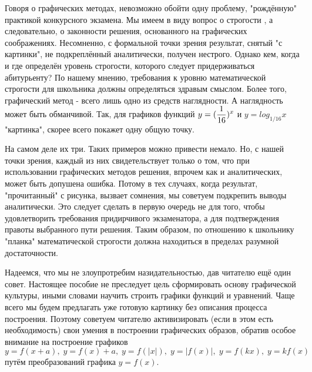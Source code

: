 \documentclass{article}
\begin{document}
 
Говоря о графических методах, невозможно обойти одну проблему, "рождённую" практикой конкурсного экзамена. Мы имеем в виду вопрос о строгости , а следовательно, о законности решения, основанного на графических соображениях. Несомненно, с формальной точки зрения результат, снятый "с картинки", не подкреплённый аналитически, получен нестрого. Однако кем, когда и где определён уровень строгости, которого следует придерживаться абитурьенту? По нашему мнению, требования к уровню математической строгости для школьника должны определяться здравым смыслом. Более того, графический метод - всего лишь одно из средств наглядности. А наглядность может быть обманчивой. Так, для графиков функций $\displaystyle y = ({{1}\over{16}})^x$ и $\displaystyle y = log_{1/16}x$ "картинка", скорее всего покажет одну общую точку.
 
На самом деле их три. Таких примеров можно привести немало. Но, с нашей точки зрения, каждый из них свидетельствует только о том, что при использовании графических методов решения, впрочем как и аналитических, может быть допушена ошибка. Потому в тех случаях, когда результат, "прочитанный" с рисунка, вызвает сомнения, мы советуем подкрепить выводы  аналитически. Это следует сделать в первую очередь не для того, чтобы удовлетворить требования придирчивого  экзаменатора, а для подтверждения правоты выбранного пути решения. Таким образом, по отношению к школьнику "планка" математической строгости должна находиться в пределах разумной достаточности.
 
Надеемся, что мы не злоупротребим назидательностью, дав читателю ещё один совет. Настоящее пособие не преследует цель сформировать основу графической культуры, иными словами научить строить графики функций и уравнений. Чаще всего мы будем предлагать уже готовую картинку без описания процесса построения. Поэтому советуем читателю активизировать (если в этом есть необходимость) свои умения в построении графических образов, обратив особое внимание на построение графиков $ y = f(x+a),\; y = f(x) + a,\; y = f(|x|),\; y = |f(x)|,\; y = f(kx),\; y = kf(x)$ путём преобразований графика $ y = f(x)$. 
 
\end{document}

